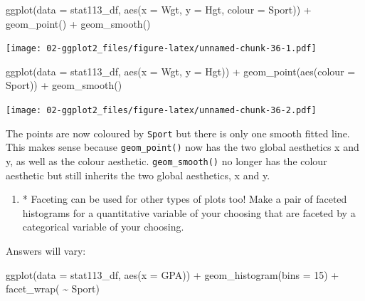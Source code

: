 \documentclass[
]{book}
\newenvironment{Shaded}{\begin{snugshade}}{\end{snugshade}}
\newcommand{\AttributeTok}[1]{\textcolor[rgb]{0.77,0.63,0.00}{#1}}
\newcommand{\DecValTok}[1]{\textcolor[rgb]{0.00,0.00,0.81}{#1}}
\newcommand{\FunctionTok}[1]{\textcolor[rgb]{0.00,0.00,0.00}{#1}}
\newcommand{\NormalTok}[1]{#1}
\newcommand{\SpecialCharTok}[1]{\textcolor[rgb]{0.00,0.00,0.00}{#1}}
\providecommand{\tightlist}{%
  \setlength{\itemsep}{0pt}\setlength{\parskip}{0pt}}
\begin{document}
\begin{Shaded}
\begin{Highlighting}[]
\FunctionTok{ggplot}\NormalTok{(}\AttributeTok{data =}\NormalTok{ stat113\_df, }\FunctionTok{aes}\NormalTok{(}\AttributeTok{x =}\NormalTok{ Wgt, }\AttributeTok{y =}\NormalTok{ Hgt, }\AttributeTok{colour =}\NormalTok{ Sport)) }\SpecialCharTok{+}
  \FunctionTok{geom\_point}\NormalTok{() }\SpecialCharTok{+}
  \FunctionTok{geom\_smooth}\NormalTok{()}
\end{Highlighting}
\end{Shaded}

\texttt{[image: 02-ggplot2\_files/figure-latex/unnamed-chunk-36-1.pdf]}

\begin{Shaded}
\begin{Highlighting}[]

\FunctionTok{ggplot}\NormalTok{(}\AttributeTok{data =}\NormalTok{ stat113\_df, }\FunctionTok{aes}\NormalTok{(}\AttributeTok{x =}\NormalTok{ Wgt, }\AttributeTok{y =}\NormalTok{ Hgt)) }\SpecialCharTok{+}
  \FunctionTok{geom\_point}\NormalTok{(}\FunctionTok{aes}\NormalTok{(}\AttributeTok{colour =}\NormalTok{ Sport)) }\SpecialCharTok{+}
  \FunctionTok{geom\_smooth}\NormalTok{()}
\end{Highlighting}
\end{Shaded}

\texttt{[image: 02-ggplot2\_files/figure-latex/unnamed-chunk-36-2.pdf]}

The points are now coloured by \texttt{Sport} but there is only one smooth fitted line. This makes sense because \texttt{geom\_point()} now has the two global aesthetics x and y, as well as the colour aesthetic. \texttt{geom\_smooth()} no longer has the colour aesthetic but still inherits the two global aesthetics, x and y.

\begin{enumerate}
\def\labelenumi{\arabic{enumi}.}
\setcounter{enumi}{4}
\tightlist
\item
  * Faceting can be used for other types of plots too! Make a pair of faceted histograms for a quantitative variable of your choosing that are faceted by a categorical variable of your choosing.
\end{enumerate}

Answers will vary:

\begin{Shaded}
\begin{Highlighting}[]
\FunctionTok{ggplot}\NormalTok{(}\AttributeTok{data =}\NormalTok{ stat113\_df, }\FunctionTok{aes}\NormalTok{(}\AttributeTok{x =}\NormalTok{ GPA)) }\SpecialCharTok{+} 
  \FunctionTok{geom\_histogram}\NormalTok{(}\AttributeTok{bins =} \DecValTok{15}\NormalTok{) }\SpecialCharTok{+}
  \FunctionTok{facet\_wrap}\NormalTok{( }\SpecialCharTok{\textasciitilde{}}\NormalTok{ Sport)}
\end{Highlighting}
\end{Shaded}
\end{document}
